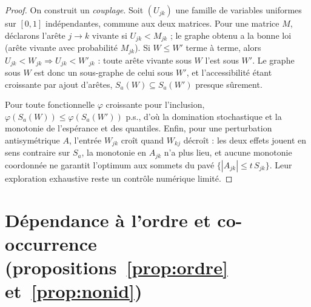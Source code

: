 \begin{proof}
On construit un \emph{couplage}. Soit $(U_{jk})$ une famille de variables uniformes sur $[0,1]$
indépendantes, commune aux deux matrices. Pour une matrice $M$, déclarons l'arête $j\to k$
vivante si $U_{jk}<M_{jk}$ ; le graphe obtenu a la bonne loi (arête vivante avec probabilité
$M_{jk}$). Si $W\le W'$ terme à terme, alors $U_{jk}<W_{jk}\Rightarrow U_{jk}<W'_{jk}$ : toute
arête vivante sous $W$ l'est sous $W'$. Le graphe sous $W$ est donc un sous-graphe de celui sous
$W'$, et l'accessibilité étant croissante par ajout d'arêtes, $S_a(W)\subseteq S_a(W')$ presque
sûrement.

Pour toute fonctionnelle $\varphi$ croissante pour l'inclusion,
$\varphi(S_a(W))\le\varphi(S_a(W'))$ p.s., d'où la domination stochastique et la monotonie de
l'espérance et des quantiles. Enfin, pour une perturbation antisymétrique $A$, l'entrée $W_{jk}$
croît quand $W_{kj}$ décroît : les deux effets jouent en sens contraire sur $S_a$, la monotonie
en $A_{jk}$ n'a plus lieu, et aucune monotonie coordonnée ne garantit l'optimum aux sommets du pavé $\{|A_{jk}|\le t\,S_{jk}\}$. Leur exploration exhaustive reste un contrôle numérique limité.
\end{proof}

\section*{Dépendance à l'ordre et co-occurrence (propositions~\ref{prop:ordre} et~\ref{prop:nonid})}

